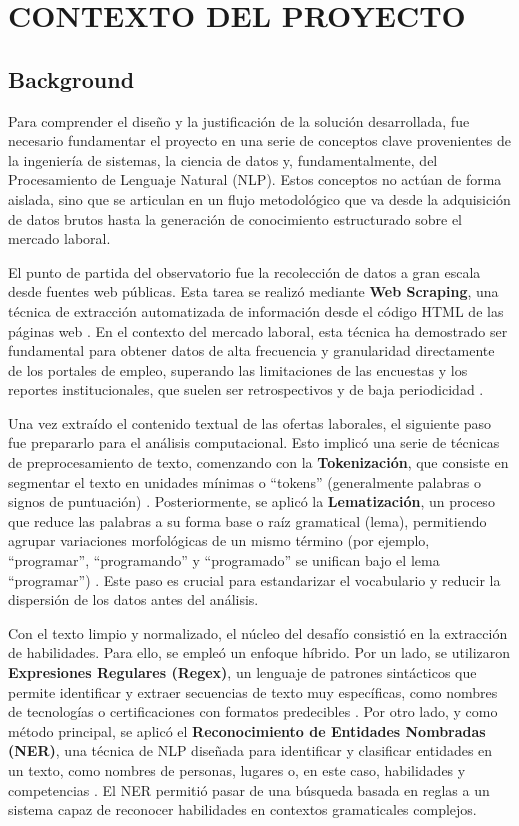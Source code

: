 \chapter{CONTEXTO DEL PROYECTO}

\section{Background}

Para comprender el diseño y la justificación de la solución desarrollada, fue necesario fundamentar el proyecto en una serie de conceptos clave provenientes de la ingeniería de sistemas, la ciencia de datos y, fundamentalmente, del Procesamiento de Lenguaje Natural (NLP). Estos conceptos no actúan de forma aislada, sino que se articulan en un flujo metodológico que va desde la adquisición de datos brutos hasta la generación de conocimiento estructurado sobre el mercado laboral.

El punto de partida del observatorio fue la recolección de datos a gran escala desde fuentes web públicas. Esta tarea se realizó mediante \textbf{Web Scraping}, una técnica de extracción automatizada de información desde el código HTML de las páginas web \parencite{orozco2019}. En el contexto del mercado laboral, esta técnica ha demostrado ser fundamental para obtener datos de alta frecuencia y granularidad directamente de los portales de empleo, superando las limitaciones de las encuestas y los reportes institucionales, que suelen ser retrospectivos y de baja periodicidad \parencite{cardenas2015, rubio2024}.

Una vez extraído el contenido textual de las ofertas laborales, el siguiente paso fue prepararlo para el análisis computacional. Esto implicó una serie de técnicas de preprocesamiento de texto, comenzando con la \textbf{Tokenización}, que consiste en segmentar el texto en unidades mínimas o ``tokens'' (generalmente palabras o signos de puntuación) \parencite{nguyen2024}. Posteriormente, se aplicó la \textbf{Lematización}, un proceso que reduce las palabras a su forma base o raíz gramatical (lema), permitiendo agrupar variaciones morfológicas de un mismo término (por ejemplo, ``programar'', ``programando'' y ``programado'' se unifican bajo el lema ``programar'') \parencite{echeverria2022}. Este paso es crucial para estandarizar el vocabulario y reducir la dispersión de los datos antes del análisis.

Con el texto limpio y normalizado, el núcleo del desafío consistió en la extracción de habilidades. Para ello, se empleó un enfoque híbrido. Por un lado, se utilizaron \textbf{Expresiones Regulares (Regex)}, un lenguaje de patrones sintácticos que permite identificar y extraer secuencias de texto muy específicas, como nombres de tecnologías o certificaciones con formatos predecibles \parencite{lukauskas2023}. Por otro lado, y como método principal, se aplicó el \textbf{Reconocimiento de Entidades Nombradas (NER)}, una técnica de NLP diseñada para identificar y clasificar entidades en un texto, como nombres de personas, lugares o, en este caso, habilidades y competencias \parencite{herandi2024}. El NER permitió pasar de una búsqueda basada en reglas a un sistema capaz de reconocer habilidades en contextos gramaticales complejos.

